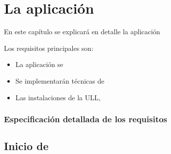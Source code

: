 %
 

\chapter{La aplicación} \label{chap:LaAplicacion} 

En este capítulo se explicará en detalle la aplicación 

Los requisitos principales  son:
\begin{itemize}
    \item La aplicación se 
    \item Se implementarán técnicas de 
    \item Las instalaciones de la ULL, 
\end{itemize}

\subsection{Especificación detallada de los requisitos} 



\section{Inicio de \ULLAR{}} \label{chap:StartApplication} 

